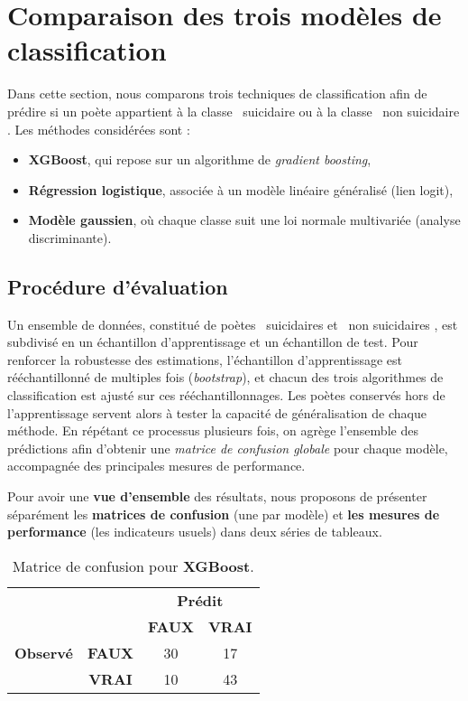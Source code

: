 \section{Comparaison des trois modèles de classification}
\label{sec:comparaison-modeles}

Dans cette section, nous comparons trois techniques de classification afin de prédire si un
poète appartient à la classe \og\, suicidaire \fg{} ou à la classe \og\, non suicidaire \fg. Les
méthodes considérées sont :

\begin{itemize}
	\item \textbf{XGBoost}, qui repose sur un algorithme de \emph{gradient boosting},
	\item \textbf{Régression logistique}, associée à un modèle linéaire généralisé (lien logit),
	\item \textbf{Modèle gaussien}, où chaque classe suit une loi normale multivariée
	(analyse discriminante).
\end{itemize}

\subsection{Procédure d’évaluation}

Un ensemble de données, constitué de poètes \og\, suicidaires \fg{} et \og\, non suicidaires \fg, 
est subdivisé en un échantillon d’apprentissage et un échantillon de test. Pour renforcer 
la robustesse des estimations, l’échantillon d’apprentissage est rééchantillonné de 
multiples fois (\emph{bootstrap}), et chacun des trois algorithmes de classification 
est ajusté sur ces rééchantillonnages. Les poètes conservés hors de l’apprentissage 
servent alors à tester la capacité de généralisation de chaque méthode.  
En répétant ce processus plusieurs fois, on agrège l’ensemble des prédictions afin 
d’obtenir une \emph{matrice de confusion globale} pour chaque modèle, accompagnée 
des principales mesures de performance.

Pour avoir une \textbf{vue d’ensemble} des résultats, nous proposons de présenter séparément 
les \textbf{matrices de confusion} (une par modèle) et \textbf{les mesures de performance} 
(les indicateurs usuels) dans deux séries de tableaux.  

\begin{table}[H]
	\centering
	\caption{Matrice de confusion pour \textbf{XGBoost}.}
	\label{tab:cm-xgboost-separee}
	\begin{tabular}{cc|cc}
		\toprule
		& & \multicolumn{2}{c}{\textbf{Prédit}} \\
		& & \textbf{FAUX} & \textbf{VRAI} \\
		\midrule
		\textbf{Observé} 
		& \textbf{FAUX} & 30 & 17 \\
		& \textbf{VRAI} & 10 & 43 \\
		\bottomrule
	\end{tabular}
\end{table}

